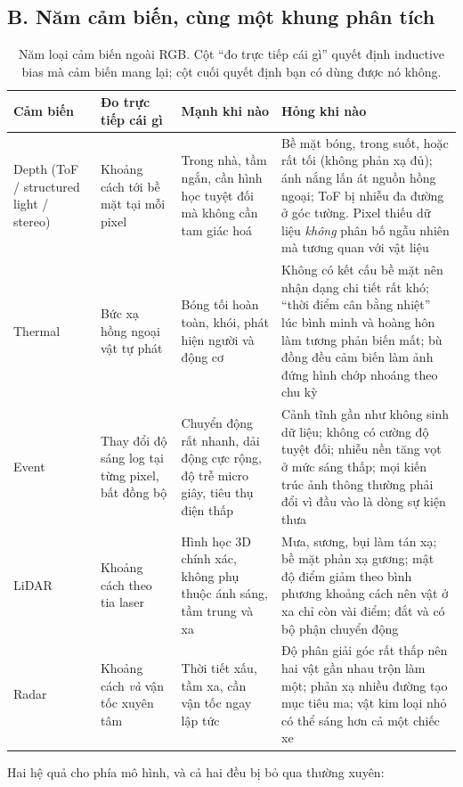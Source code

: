 \documentclass[../../../deep_learning.tex]{subfiles}
\begin{document}
\subsection{B. Năm cảm biến, cùng một khung phân tích}
\begin{table}[H]\centering\footnotesize
\caption{Năm loại cảm biến ngoài RGB. Cột ``đo trực tiếp cái gì'' quyết định inductive bias mà cảm biến mang lại; cột cuối quyết định bạn có dùng được nó không.}
\label{tab:cam-bien}
\begin{tabularx}{\linewidth}{@{}L{1.6cm}L{2.7cm}YL{4.3cm}@{}}
\toprule
\textbf{Cảm biến} & \textbf{Đo trực tiếp cái gì} & \textbf{Mạnh khi nào} & \textbf{Hỏng khi nào}\\
\midrule
Depth (ToF / structured light / stereo) & Khoảng cách tới bề mặt tại mỗi pixel & Trong nhà, tầm ngắn, cần hình học tuyệt đối mà không cần tam giác hoá & Bề mặt bóng, trong suốt, hoặc rất tối (không phản xạ đủ); ánh nắng lấn át nguồn hồng ngoại; ToF bị nhiễu đa đường ở góc tường. Pixel thiếu dữ liệu \emph{không} phân bố ngẫu nhiên mà tương quan với vật liệu\\
Thermal & Bức xạ hồng ngoại vật tự phát & Bóng tối hoàn toàn, khói, phát hiện người và động cơ & Không có kết cấu bề mặt nên nhận dạng chi tiết rất khó; ``thời điểm cân bằng nhiệt'' lúc bình minh và hoàng hôn làm tương phản biến mất; bù đồng đều cảm biến làm ảnh đứng hình chớp nhoáng theo chu kỳ\\
Event & Thay đổi độ sáng log tại từng pixel, bất đồng bộ & Chuyển động rất nhanh, dải động cực rộng, độ trễ micro giây, tiêu thụ điện thấp & Cảnh tĩnh gần như không sinh dữ liệu; không có cường độ tuyệt đối; nhiễu nền tăng vọt ở mức sáng thấp; mọi kiến trúc ảnh thông thường phải đổi vì đầu vào là dòng sự kiện thưa\\
LiDAR & Khoảng cách theo tia laser & Hình học 3D chính xác, không phụ thuộc ánh sáng, tầm trung và xa & Mưa, sương, bụi làm tán xạ; bề mặt phản xạ gương; mật độ điểm giảm theo bình phương khoảng cách nên vật ở xa chỉ còn vài điểm; đắt và có bộ phận chuyển động\\
Radar & Khoảng cách \emph{và} vận tốc xuyên tâm & Thời tiết xấu, tầm xa, cần vận tốc ngay lập tức & Độ phân giải góc rất thấp nên hai vật gần nhau trộn làm một; phản xạ nhiều đường tạo mục tiêu ma; vật kim loại nhỏ có thể sáng hơn cả một chiếc xe\\
\bottomrule
\end{tabularx}
\end{table}

Hai hệ quả cho phía mô hình, và cả hai đều bị bỏ qua thường xuyên:
\end{document}

